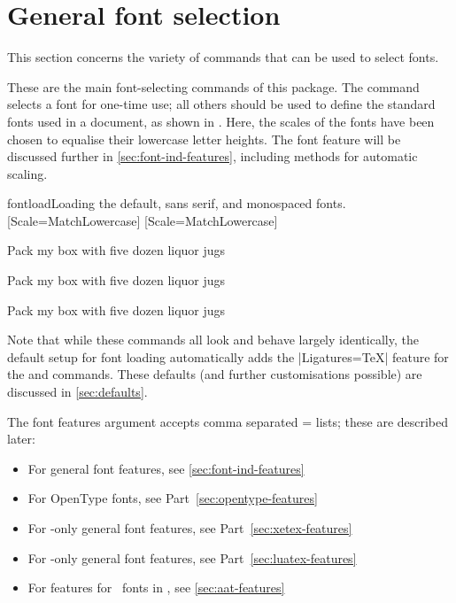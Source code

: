 

\part{General font selection}

This section concerns the variety of commands that can be used to select
fonts.


These are the main font-selecting commands of this package.
The  command selects a font for one-time use; all
others should be used to define the standard fonts used in a document, as shown in .
Here, the scales of the fonts have been chosen to equalise their
lowercase letter heights. The  font feature will be discussed
further in \vref{sec:font-ind-features}, including methods for automatic
scaling.

\begin{Lexample}{fontload}{Loading the default, sans serif, and monospaced fonts.}
  \setmainfont{texgyrebonum-regular.otf}
  \setsansfont{lmsans10-regular.otf}[Scale=MatchLowercase]
  \setmonofont{Inconsolata.otf}[Scale=MatchLowercase]

  \rmfamily Pack my box with five dozen liquor jugs\par
  \sffamily Pack my box with five dozen liquor jugs\par
  \ttfamily Pack my box with five dozen liquor jugs
\end{Lexample}

Note that while these commands all look and behave largely identically, the default setup for font loading automatically adds the |Ligatures=TeX| feature for the  and  commands.
These defaults (and further customisations possible) are discussed in \vref{sec:defaults}.

The font features argument accepts comma separated
= lists; these are described later:
\begin{itemize}
\item For general font features, see \vref{sec:font-ind-features}
\item For OpenType fonts, see Part~\vref{sec:opentype-features}
\item For \XeTeX-only general font features, see Part~\vref{sec:xetex-features}
\item For \LuaTeX-only general font features, see Part~\vref{sec:luatex-features}
\item For features for \AAT\ fonts in \XeTeX, see \vref{sec:aat-features}
\end{itemize}

